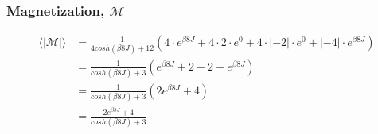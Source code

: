 \documentclass{article}
\begin{document}
\subsubsection*{Magnetization, $\mathcal M$}
\begin{align}\label{eq:mean_abs_mag}
    \langle \mathcal{|M|} \rangle &= \frac{1}{4cosh(\beta 8J) + 12} \left( 4 \cdot e^{\beta8J} + 4 \cdot 2 \cdot e^{0} + 4 \cdot |-2| \cdot e^{0} + |-4| \cdot e^{\beta 8J} \right)\nonumber \\
    &= \frac{1}{cosh(\beta 8J) + 3} \left( e^{\beta 8J} + 2 +2 +e^{\beta 8J} \right)\nonumber \\
    &=\frac{1}{cosh(\beta 8J) + 3} \left( 2e^{\beta 8J} + 4 \right)\nonumber \\
    &=\frac{ 2e^{\beta 8J} + 4}{cosh(\beta 8J) + 3}
\end{align}

\printbibliography
\end{document}
